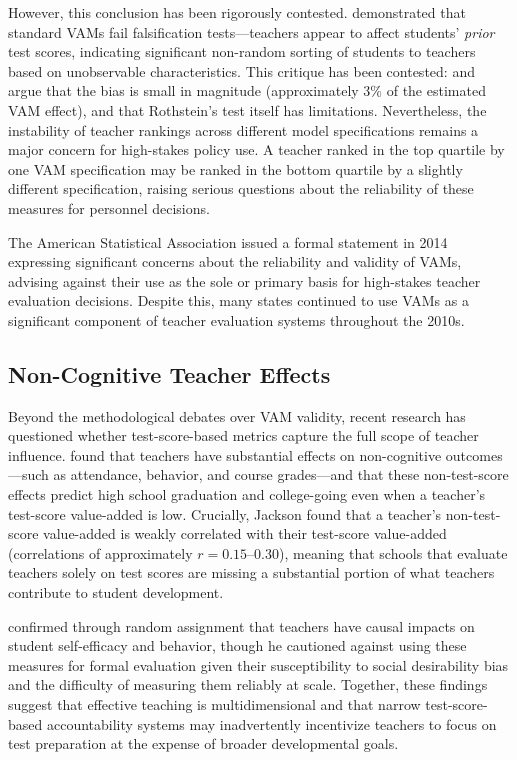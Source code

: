 \documentclass[12pt,letterpaper]{article}
\begin{document}
However, this conclusion has been rigorously contested. \citet{rothstein2010} demonstrated that standard VAMs fail falsification tests---teachers appear to affect students' \textit{prior} test scores, indicating significant non-random sorting of students to teachers based on unobservable characteristics. This critique has been contested: \citet{chetty2014a} and \citeauthor{goldhaber2015} argue that the bias is small in magnitude (approximately 3\% of the estimated VAM effect), and that Rothstein's test itself has limitations. Nevertheless, the instability of teacher rankings across different model specifications remains a major concern for high-stakes policy use. A teacher ranked in the top quartile by one VAM specification may be ranked in the bottom quartile by a slightly different specification, raising serious questions about the reliability of these measures for personnel decisions.

The American Statistical Association issued a formal statement in 2014 expressing significant concerns about the reliability and validity of VAMs, advising against their use as the sole or primary basis for high-stakes teacher evaluation decisions. Despite this, many states continued to use VAMs as a significant component of teacher evaluation systems throughout the 2010s.

\subsection{Non-Cognitive Teacher Effects}

Beyond the methodological debates over VAM validity, recent research has questioned whether test-score-based metrics capture the full scope of teacher influence. \citet{jackson2018a} found that teachers have substantial effects on non-cognitive outcomes---such as attendance, behavior, and course grades---and that these non-test-score effects predict high school graduation and college-going even when a teacher's test-score value-added is low. Crucially, Jackson found that a teacher's non-test-score value-added is weakly correlated with their test-score value-added (correlations of approximately $r = 0.15$--$0.30$), meaning that schools that evaluate teachers solely on test scores are missing a substantial portion of what teachers contribute to student development.

\citet{blazar2018} confirmed through random assignment that teachers have causal impacts on student self-efficacy and behavior, though he cautioned against using these measures for formal evaluation given their susceptibility to social desirability bias and the difficulty of measuring them reliably at scale. Together, these findings suggest that effective teaching is multidimensional and that narrow test-score-based accountability systems may inadvertently incentivize teachers to focus on test preparation at the expense of broader developmental goals.
\end{document}
